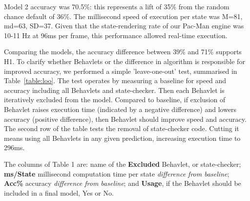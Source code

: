 \documentclass[conference]{IEEEtran}
\begin{document}
Model 2 accuracy was 70.5\%: this represents a lift of 35\% from the random chance default of 36\%. The millisecond speed of execution per state was M=81, md=63, SD=37. Given that the state-rendering rate of our Pac-Man engine was 10-11 Hz at 96ms per frame, this performance allowed real-time execution.

Comparing the models, the accuracy difference between 39\% and 71\% supports \textsf{H1}. To clarify whether Behavlets or the difference in algorithm is responsible for improved accuracy, we performed a simple 'leave-one-out' test, summarised in Table~\ref{table:loo}. The test operates by measuring a baseline for speed and accuracy including all Behavlets and state-checker. Then each Behavlet is iteratively excluded from the model. Compared to baseline, if exclusion of Behavlet  raises execution time (indicated by a negative difference) and lowers accuracy (positive difference), then Behavlet  should improve speed and accuracy. The second row of the table tests the removal of state-checker code. Cutting it means using all Behavlets in any given prediction, increasing execution time to 296ms.

The columns of Table 1 are: name of the \textbf{Excluded} Behavlet, or state-checker; \textbf{ms/State} millisecond computation time per state \textit{difference from baseline}; \textbf{Acc\%} accuracy \textit{difference from baseline}; and \textbf{Usage}, if the Behavlet should be included in a final model, Yes or No.
\end{document}
